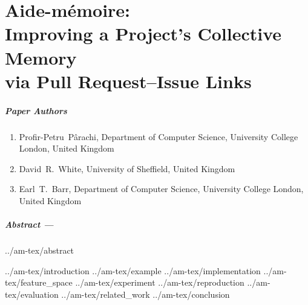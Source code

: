 \chapter[Aide-mémoire: Improving a Project’s Collective Memory via Pull Request--Issue Links]{Aide-mémoire:\\Improving a Project’s Collective Memory\\via Pull Request--Issue Links}
\label{chapter:am}


\newcommand{\ourtool}{\textsc{A-m}\xspace}
\newcommand{\Ourtool}{\textsc{A-m}\xspace}
\newcommand{\Ourtoollong}{Aide-m\'emoire\xspace}
\newcommand{\ourtoollong}{Aide-m\'emoire\xspace}
\newcommand{\ourMAPresult}{$0.95$\xspace}
\newcommand{\ourMAPresultJava}{$1.00$\xspace}
\newcommand{\RCMAP}{$0.26$\xspace}
\newcommand{\ourHitresult}{$0.86$\xspace}
\newcommand{\ourHitresultJava}{$0.92$\xspace}
\newcommand{\ourPatOneresult}{$94\%$\xspace}
\newcommand{\corpusSize}{213\xspace} %
\newcommand{\excludedDueToSize}{72\xspace}
\newcommand{\projectPage}{\url{https://github.com/PPPI/a-m}}


\paragraph{Paper Authors}%
\begin{enumerate}
    \item[]  Profir-Petru~P\^arachi, Department of Computer Science, University College London, United Kingdom
    \item[] David~R.~White, University of Sheffield, United Kingdom
    \item[] Earl~T.~Barr, Department of Computer Science, University College London, United Kingdom
\end{enumerate}

\paragraph{Abstract ---}
{../am-tex/abstract}

{../am-tex/introduction}
{../am-tex/example}
{../am-tex/implementation}
{../am-tex/feature_space}
{../am-tex/experiment}
{../am-tex/reproduction}
{../am-tex/evaluation}
{../am-tex/related_work}
{../am-tex/conclusion}
